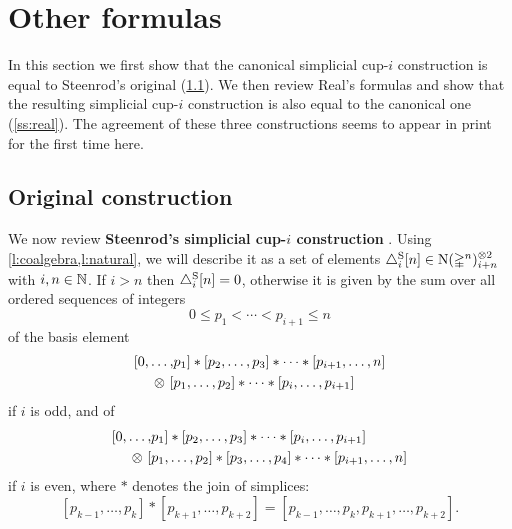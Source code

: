 
\section{Other formulas}\label{s:others}

In this section we first show that the canonical simplicial \mbox{cup-$i$} construction is equal to Steenrod's original (\cref{ss:original}).
We then review Real's formulas and show that the resulting simplicial \mbox{cup-$i$} construction is also equal to the canonical one (\cref{ss:real}).
The agreement of these three constructions seems to appear in print for the first time here.

\subsection{Original construction}\label{ss:original}

We now review \textbf{Steenrod's simplicial \mbox{cup-$i$} construction} \cite[p.293]{steenrod1947products}.
Using \cref{l:coalgebra,l:natural}, we will describe it as a set of elements $\triangle_i^{\mathrm{S}} [n] \in \operatorname{N}(\mathbb{\Delta}^n)^{\otimes 2}_{i+n}$ with $i,n \in \mathbb{N}$.
If $i > n$ then $\triangle_i^{\mathrm{S}} [n] = 0$, otherwise it is given by the sum over all ordered sequences of integers
\[
0 \leq p_1 < \cdots < p_{i+1} \leq n
\]
of the basis element
\begin{equation}\label{e:original i odd}
\begin{split}
[ 0, \dots, &{p_1} ] \ast [ {p_2}, \dots, {p_3} ] \ast \cdots \ast [ {p_{i+1}}, \dots, n ] \\
\otimes \ [ &{p_1}, \dots, {p_2} ] \ast \cdots \ast [ {p_{i}}, \dots, {p_{i+1}} ]
\end{split}
\end{equation}
if $i$ is odd, and of
\begin{equation}\label{e:original i even}
\begin{split}
[ 0, \dots, &{p_1} ] \ast [ {p_2}, \dots, {p_3} ] \ast \cdots \ast [ {p_{i}}, \dots, {p_{i+1}} ] \\
\otimes \ [ &{p_1}, \dots, {p_2} ] \ast [ {p_3}, \dots, {p_4} ] \ast \cdots \ast [ {p_{i+1}}, \dots, n ]
\end{split}
\end{equation}
if $i$ is even, where $\ast$ denotes the join of simplices:
\[
[{p_{k-1}}, \dots, {p_{k}} ] \ast [ {p_{k+1}}, \dots, p_{k+2}] = [{p_{k-1}}, \dots, p_k, p_{k+1}, \dots, p_{k+2}].
\]

